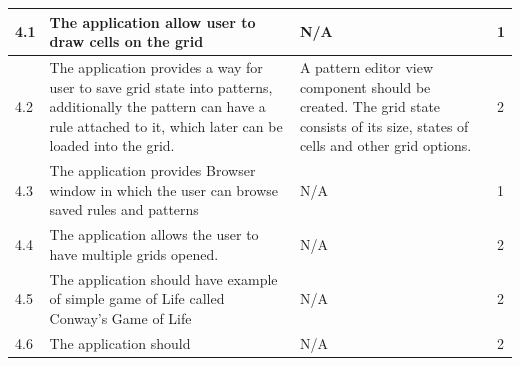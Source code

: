 \documentclass{article}
\begin{document}
\begin{center}
\begin{tabular}{| l | p{7cm} | p{5cm} | l |}
		4.1 & 
		The application allow user to draw cells on the grid & 
		N/A &
		1
		\\ \hline		

		4.2 & 
		The application provides a way for user to save grid state into patterns, additionally
		the pattern can have a rule attached to it, which later can be loaded into the grid.  & 
		A pattern editor view component should be created.
		The grid state consists of its size, states of cells and other grid options.&
		2
		\\ \hline				

		4.3 & 
		The application provides Browser window in which the 
		user can browse saved rules and patterns & 
		N/A &
		1 
		\\ \hline
	
		4.4 & 
		The application allows the user to have multiple grids opened. &
		N/A &
		2 
		\\ \hline
		4.5 & 
		The application should have example of simple game of Life called
		Conway's Game of Life &
		N/A &
		2 
		
		\\ \hline
		4.6 & 
		The application should &
		N/A &
		2 
		\\ \hline
	
	\end{tabular}

\end{center}

\newpage
\end{document}
